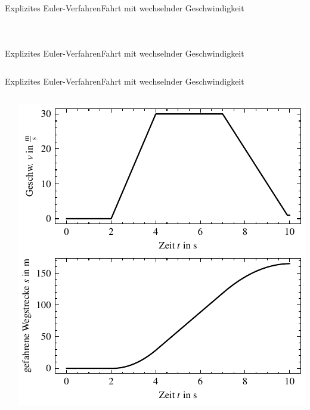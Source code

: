 \documentclass[xelatex,aspectratio=169]{beamer}
\begin{document}
\begin{frame}{Explizites Euler-Verfahren}{Fahrt mit wechselnder Geschwindigkeit}
    \begin{columns}
        \begin{column}{0.5\textwidth}
            \small
            \inputminted[firstline=8, lastline=17]{python}{src/sim_drive.py}
        \end{column}
        \begin{column}{0.5\textwidth}
            \small
            \inputminted[firstline=20, lastline=30]{python}{src/sim_drive.py}
        \end{column}
    \end{columns}
\end{frame}

\begin{frame}{Explizites Euler-Verfahren}{Fahrt mit wechselnder Geschwindigkeit}
    \inputminted[firstline=33, lastline=42]{python}{src/sim_drive.py}
\end{frame}

\begin{frame}{Explizites Euler-Verfahren}{Fahrt mit wechselnder Geschwindigkeit}
    \begin{columns}[T]
        \begin{column}{0.5\textwidth}
            \inputminted[lastline=12]{python3}{src/sim_drive_result.txt}
        \end{column}
        \begin{column}{0.5\textwidth}
            \includegraphics[height=.8\textheight]{fig/sim_drive_plot.pdf}
        \end{column}
    \end{columns}
\end{frame}
\end{document}
